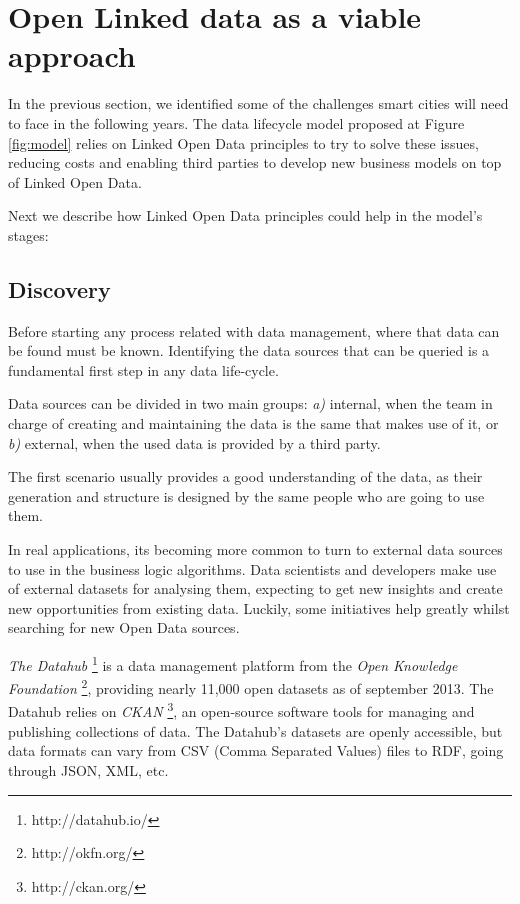\section{Open Linked data as a viable approach}

In the previous section, we identified some of the challenges smart cities will need to face in the following years. The data lifecycle model proposed at Figure \ref{fig:model} relies on Linked Open Data principles to try to solve these issues, reducing costs and enabling third parties to develop new business models on top of Linked Open Data.

Next we describe how Linked Open Data principles could help in the model's stages:

\subsection{Discovery}\label{subsec:discovery}

Before starting any process related with data management, where that data can be found must be known. Identifying the data sources that can be queried is a fundamental first step in any data life-cycle.

Data sources can be divided in two main groups: \textit{a)} internal, when the team in charge of creating and maintaining the data is the same that makes use of it, or \textit{b)} external, when the used data is provided by a third party.

The first scenario usually provides a good understanding of the data, as their generation and structure is designed by the same people who are going to use them.

In real applications, its becoming more common to turn to external data sources to use in the business logic algorithms. Data scientists and developers make use of external datasets for analysing them, expecting to get new insights and create new opportunities from existing data. Luckily, some initiatives help greatly whilst searching for new Open Data sources.

\textit{The Datahub} \footnote{http://datahub.io/} is a data management platform from the \textit{Open Knowledge Foundation} \footnote{http://okfn.org/}, providing nearly 11,000 open datasets as of september 2013. The Datahub relies on \textit{CKAN} \footnote{http://ckan.org/}, an open-source software tools for managing and publishing collections of data. The Datahub's datasets are openly accessible, but data formats can vary from CSV (Comma Separated Values) files to RDF, going through JSON, XML, etc.


